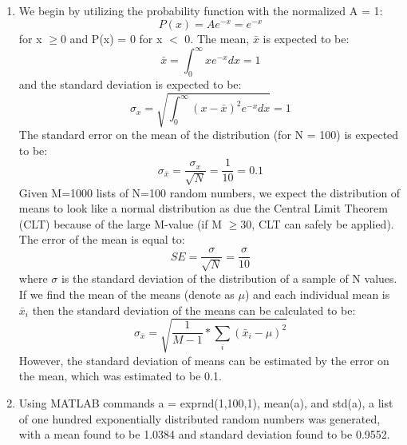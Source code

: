 \documentclass{article}
\begin{document}
    \subsection{}
        \begin{enumerate}
            \item We begin by utilizing the probability function with the normalized A = 1:
            \begin{equation}
                P(x) = A e^{-x} = e^{-x} 
            \end{equation}
            for x $\geq 0$ and P(x) = 0 for x $<$ 0. The mean, $\bar{x}$ is expected to be:
            \begin{equation}
                \bar{x} = \int_{0}^{\infty} x e^{-x} dx = 1
            \end{equation}
            and the standard deviation is expected to be:
            \begin{equation}
                \sigma_x = \sqrt{\int_{0}^{\infty} (x - \bar{x})^{2} e^{-x} dx} = 1
            \end{equation}
            The standard error on the mean of the distribution (for N = 100) is expected to be:
            \begin{equation}
                \sigma_{\bar{x}} = \frac{\sigma_x}{\sqrt{N}} = \frac{1}{10} = 0.1
            \end{equation}
            Given M=1000 lists of N=100 random numbers, we expect the distribution of means to look like a normal distribution as due the Central Limit Theorem (CLT) because of the large M-value (if M $\geq 30$, CLT can safely be applied). The error of the mean is equal to:
            \begin{equation}
                SE = \frac{\sigma}{\sqrt{N}} = \frac{\sigma}{10}
            \end{equation}
            where $\sigma$ is the standard deviation of the distribution of a sample of N values. If we find the mean of the means (denote as $\mu$) and each individual mean is $\bar{x}_i$ then the standard deviation of the means can be calculated to be:
            \begin{equation}
                \sigma_{\bar{x}} = \sqrt{\frac{1}{M-1}*\sum_i (\bar{x}_i - \mu)^{2}}
            \end{equation}
            However, the standard deviation of means can be estimated by the error on the mean, which was estimated to be 0.1.
            \item Using MATLAB commands a = exprnd(1,100,1), mean(a), and std(a), a list of one hundred exponentially distributed random numbers was generated, with a mean found to be 1.0384 and standard deviation found to be 0.9552.

\end{enumerate}
\end{document}
